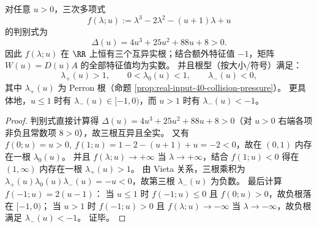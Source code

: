 \begin{proposition}\label{prop:real-input-40-collision-all-real}
对任意 \(u>0\)，三次多项式
\[
f(\lambda;u):=\lambda^3-2\lambda^2-(u+1)\lambda+u
\]
的判别式为
\[
\Delta(u)=4u^3+25u^2+88u+8>0.
\]
因此 \(f(\lambda;u)\) 在 \(\RR\) 上恒有三个互异实根；结合额外特征值 \(-1\)，矩阵 \(W(u)=D(u)A\) 的全部特征值均为实数。
并且根型（按大小/符号）满足：
\[
\lambda_+(u)>1,\qquad 0<\lambda_0(u)<1,\qquad \lambda_-(u)<0,
\]
其中 \(\lambda_+(u)\) 为 Perron 根（命题 \ref{prop:real-input-40-collision-pressure}）。
更具体地，\(u\le 1\) 时有 \(\lambda_-(u)\in[-1,0)\)，而 \(u>1\) 时有 \(\lambda_-(u)<-1\)。
\end{proposition}
\begin{proof}
判别式直接计算得 \(\Delta(u)=4u^3+25u^2+88u+8>0\)（对 \(u>0\) 右端各项非负且常数项 \(8>0\)），故三根互异且全实。
又有 \(f(0;u)=u>0,\ f(1;u)=1-2-(u+1)+u=-2<0\)，故在 \((0,1)\) 内存在一根 \(\lambda_0(u)\)。
并且 \(f(\lambda;u)\to+\infty\) 当 \(\lambda\to+\infty\)，结合 \(f(1;u)<0\) 得在 \((1,\infty)\) 内存在一根 \(\lambda_+(u)>1\)。
由 Vieta 关系，三根乘积为 \(\lambda_+(u)\lambda_0(u)\lambda_-(u)=-u<0\)，故第三根 \(\lambda_-(u)\) 为负数。
最后计算
\(
f(-1;u)=2(u-1)
\)：
当 \(u\le 1\) 时 \(f(-1;u)\le 0\) 且 \(f(0;u)>0\)，故负根落在 \([-1,0)\)；
当 \(u>1\) 时 \(f(-1;u)>0\) 且 \(f(\lambda;u)\to-\infty\) 当 \(\lambda\to-\infty\)，故负根满足 \(\lambda_-(u)<-1\)。
证毕。
\end{proof}

